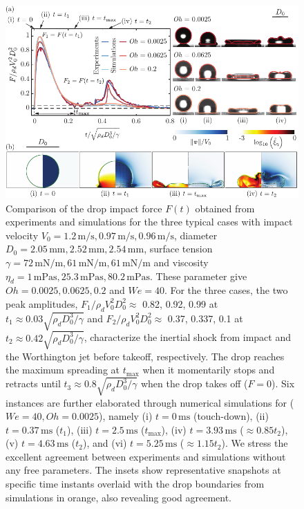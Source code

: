 \documentclass{jfm}
\newcommand{\vs}{\color{orange} \normalfont}
\begin{document}
\begin{figure}
	\centering
	\includegraphics[width=\textwidth]{Figures/Figure1_summary_v6.pdf}
	\caption{{\vs Comparison of the drop impact force $F(t)$ obtained from experiments and simulations for the three typical cases with impact velocity $V_0 = 1.2\,\si{\meter}/\si{\second}, 0.97\,\si{\meter}/\si{\second}, 0.96\,\si{\meter}/\si{\second}$, diameter $D_0 = 2.05\,\si{\milli\meter}, 2.52\,\si{\milli\meter}, 2.54\,\si{\milli\meter}$, surface tension $\gamma = 72\,\si{\milli\newton}/\si{\meter}, 61\,\si{\milli\newton}/\si{\meter}, 61\,\si{\milli\newton}/\si{\meter}$ and viscosity $\eta_d = 1\,\si{\milli\pascal\second}, 25.3\,\si{\milli\pascal\second}, 80.2\,\si{\milli\pascal\second}$. These parameter give $Oh = 0.0025, 0.0625, 0.2$ and $We = 40$.
		For the three cases, the two peak amplitudes, $F_1/\rho_dV_0^2D_0^2 \approx$ 0.82, 0.92, 0.99 at $t_1 \approx 0.03\sqrt{\rho_dD_0^3/\gamma}$ and $F_2/\rho_dV_0^2D_0^2 \approx$ 0.37, 0.337, 0.1 at $t_2 \approx 0.42\sqrt{\rho_dD_0^3/\gamma}$, characterize the inertial shock from impact and the Worthington jet before takeoff, respectively. 
		The drop reaches the maximum spreading at $t_{\text{max}}$ when it momentarily stops and retracts until $t_3 \approx 0.8\sqrt{\rho_dD_0^3/\gamma}$ when the drop takes off ($F = 0$).
		Six instances are further elaborated through numerical simulations for ($We = 40, Oh = 0.0025$), namely (i) $t = 0\,\si{\milli\second}$ (touch-down), (ii) $t = 0.37\,\si{\milli\second}$ ($t_1$), (iii) $t = 2.5\,\si{\milli\second}$ ($t_{\text{max}}$), (iv) $t = 3.93\,\si{\milli\second}$ ($\approx 0.85t_2$), (v) $t = 4.63\,\si{\milli\second}$ ($t_2$), and (vi) $t = 5.25\,\si{\milli\second}$ ($\approx 1.15t_2$). 
		We stress the excellent agreement between experiments and simulations without any free parameters. The insets show representative snapshots at specific time instants overlaid with the drop boundaries from simulations in orange, also revealing good agreement. 
}}
\end{figure}
\end{document}
